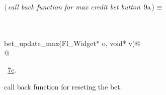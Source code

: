 \documentclass{article}
\renewcommand{\NWtarget}[2]{\hypertarget{#1}{#2}}
\renewcommand{\NWlink}[2]{\hyperlink{#1}{#2}}
\begin{document}
\begin{flushleft} \small
\begin{minipage}{\linewidth}\label{scrap13}\raggedright\small
\NWtarget{nuweb9a}{} $\langle\,${\it call back function for max credit bet button}\nobreak\ {\footnotesize {9a}}$\,\rangle\equiv$
\vspace{-1ex}
\begin{list}{}{} \item
\mbox{}\verb@@\\
\mbox{}\verb@@\\
\mbox{}\verb@void bet_update_max(Fl_Widget* o, void* v)@\\
\mbox{}@\\
\mbox{}\verb@@{\NWsep}
\end{list}
\vspace{-1.5ex}
\footnotesize
\begin{list}{}{\setlength{\itemsep}{-\parsep}\setlength{\itemindent}{-\leftmargin}}
\item \NWtxtMacroRefIn\ \NWlink{nuweb7c}{7c}.

\item{}
\end{list}
\end{minipage}\vspace{4ex}
\end{flushleft}
call back function for reseting the bet. 
\end{document}
